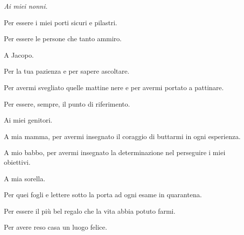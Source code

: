 \cleardoublepage
\thispagestyle{empty}
\begin{flushright}
\itshape 
Ai miei nonni. 

Per essere i miei porti sicuri e pilastri. 

Per essere le persone che tanto ammiro.

\vspace{30mm}

A Jacopo. 

Per la tua pazienza e per sapere ascoltare. 

Per avermi svegliato quelle mattine nere e per avermi portato a pattinare. 

Per essere, sempre, il punto di riferimento. 

\vspace{30mm}

Ai miei genitori. 

A mia mamma, per avermi insegnato il coraggio di buttarmi in ogni esperienza.

A mio babbo, per avermi insegnato la determinazione nel perseguire i miei obiettivi.


\vspace{30mm}

A mia sorella. 

Per quei fogli e lettere sotto la porta ad ogni esame in quarantena.

Per essere il più bel regalo che la vita abbia potuto farmi.

Per avere reso casa un luogo felice.

\end{flushright}
\cleardoublepage
